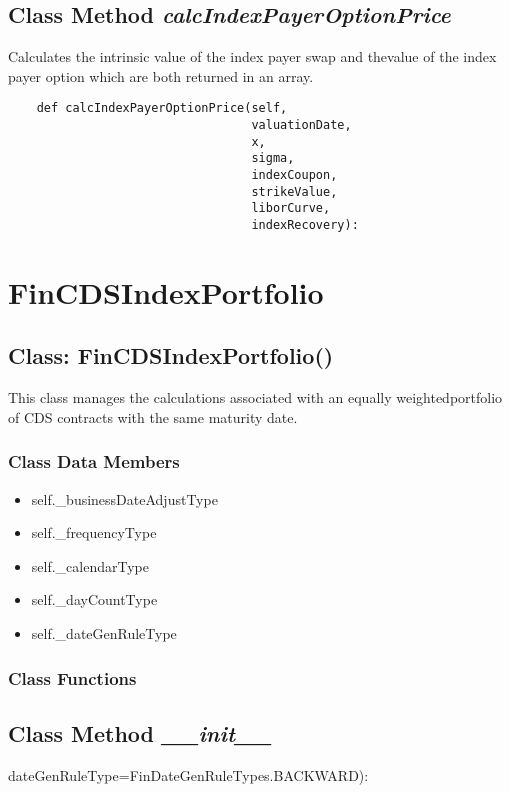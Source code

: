 \documentclass[twoside,11pt]{book}
\begin{document}
\subsection{Class Method {\it calcIndexPayerOptionPrice}}
Calculates the intrinsic value of the index payer swap and thevalue of the index payer option which are both returned in an array. 

\begin{lstlisting}
    def calcIndexPayerOptionPrice(self,
                                  valuationDate,
                                  x,
                                  sigma,
                                  indexCoupon,
                                  strikeValue,
                                  liborCurve,
                                  indexRecovery):
\end{lstlisting}

\newpage
\section{FinCDSIndexPortfolio}

\subsection{Class: FinCDSIndexPortfolio()}
This class manages the calculations associated with an equally weightedportfolio of CDS contracts with the same maturity date. 

\subsubsection{Class Data Members}
\begin{itemize}
\item{self.\_businessDateAdjustType}
\item{self.\_frequencyType}
\item{self.\_calendarType}
\item{self.\_dayCountType}
\item{self.\_dateGenRuleType}
\end{itemize}

\subsubsection{Class Functions}

\subsection{Class Method {\it \_\_init\_\_}}
dateGenRuleType=FinDateGenRuleTypes.BACKWARD):
\end{document}
